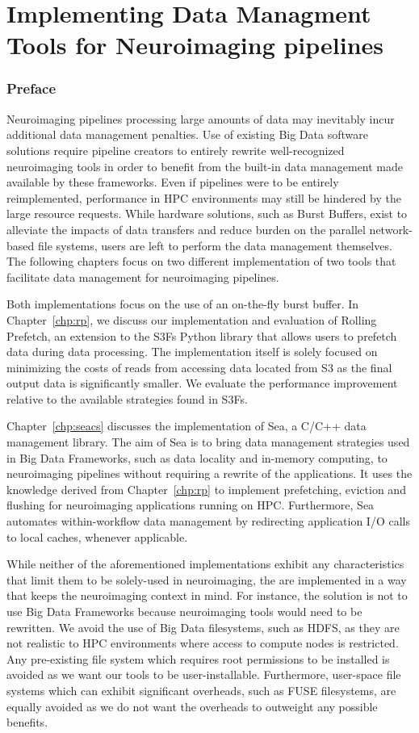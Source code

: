 \part{Implementing Data Managment Tools for Neuroimaging pipelines}
\section*{Preface}

Neuroimaging pipelines processing large amounts of data may inevitably incur additional data management penalties.
Use of existing Big Data software solutions require pipeline creators to entirely rewrite well-recognized neuroimaging
tools in order to benefit from the built-in data management made available by these frameworks. Even if pipelines were to
be entirely reimplemented, performance in HPC environments may still be hindered by the large resource requests. 
While hardware solutions, such as Burst Buffers, exist to alleviate the impacts of data transfers and reduce burden on the
parallel network-based file systems, users are left to perform the data management themselves. The following chapters focus on
two different implementation of two tools that facilitate data management for neuroimaging pipelines. 

Both implementations focus on the use of an on-the-fly burst buffer. In Chapter~\ref{chp:rp}, we discuss our implementation and evaluation
of Rolling Prefetch, an extension to the S3Fs Python library that allows users to prefetch data during data processing. The implementation itself
is solely focused on minimizing the costs of reads from accessing data located from S3 as the final output data is significantly smaller. We evaluate
the performance improvement relative to the available strategies found in S3Fs. 

Chapter~\ref{chp:seacs} discusses the implementation of Sea, a C/C++ data management library. The aim of Sea is to bring data management 
strategies used in Big Data Frameworks, such as data locality and in-memory computing, to neuroimaging pipelines without requiring a rewrite
of the applications. It uses the knowledge
derived from Chapter~\ref{chp:rp} to implement prefetching, eviction and flushing for neuroimaging applications running on HPC.
Furthermore, Sea automates within-workflow data management by redirecting application I/O calls to local caches, whenever applicable. 

While neither of the aforementioned implementations exhibit any characteristics that limit them to be solely-used in neuroimaging,
the are implemented in a way that keeps the neuroimaging context in mind. For instance, the solution is not to use Big Data Frameworks because
neuroimaging tools would need to be rewritten. We avoid the use of Big Data filesystems, such as HDFS, as they are not realistic to HPC environments
where access to compute nodes is restricted. Any pre-existing file system which requires root permissions to be installed is avoided as we
want our tools to be user-installable. Furthermore, user-space file systems which can exhibit significant overheads, such as FUSE filesystems, are
equally avoided as we do not want the overheads to outweight any possible benefits.